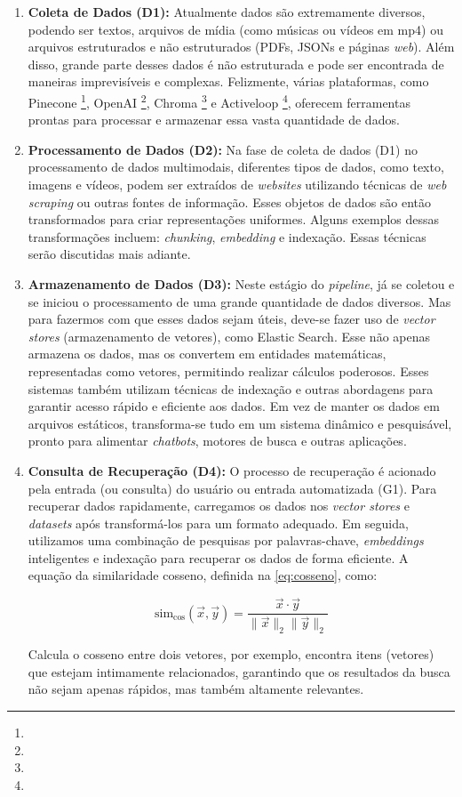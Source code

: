 \documentclass[a4paper, 12pt]{article}
\begin{document}
    \begin{enumerate}
        \item \textbf{Coleta de Dados (D1):} Atualmente dados são extremamente diversos, podendo ser textos, arquivos de mídia (como músicas ou vídeos em mp4) ou arquivos estruturados e não estruturados (PDFs, JSONs e páginas \textit{web}). Além disso, grande parte desses dados é não estruturada e pode ser encontrada de maneiras imprevisíveis e complexas. Felizmente, várias plataformas, como Pinecone \footnote{}, OpenAI \footnote{}, Chroma \footnote{} e Activeloop \footnote{}, oferecem ferramentas prontas para processar e armazenar essa vasta quantidade de dados.
        \item \textbf{Processamento de Dados (D2):} Na fase de coleta de dados (D1) no processamento de dados multimodais, diferentes tipos de dados, como texto, imagens e vídeos, podem ser extraídos de \textit{websites} utilizando técnicas de \textit{web scraping} ou outras fontes de informação. Esses objetos de dados são então transformados para criar representações uniformes. Alguns exemplos dessas transformações incluem: \textit{chunking}, \textit{embedding} e indexação. Essas técnicas serão discutidas mais adiante.
        \item \textbf{Armazenamento de Dados (D3):} Neste estágio do \textit{pipeline}, já se coletou e se iniciou o processamento de uma grande quantidade de dados diversos. Mas para fazermos com que esses dados sejam úteis, deve-se fazer uso de \textit{vector stores} (armazenamento de vetores), como Elastic Search. Esse não apenas armazena os dados, mas os convertem em entidades matemáticas, representadas como vetores, permitindo realizar cálculos poderosos. Esses sistemas também utilizam técnicas de indexação e outras abordagens para garantir acesso rápido e eficiente aos dados. Em vez de manter os dados em arquivos estáticos, transforma-se tudo em um sistema dinâmico e pesquisável, pronto para alimentar \textit{chatbots}, motores de busca e outras aplicações.
        \item \textbf{Consulta de Recuperação (D4):} O processo de recuperação é acionado pela entrada (ou consulta) do usuário ou entrada automatizada (G1). Para recuperar dados rapidamente, carregamos os dados nos \textit{vector stores} e \textit{datasets} após transformá-los para um formato adequado. Em seguida, utilizamos uma combinação de pesquisas por palavras-chave, \textit{embeddings} inteligentes e indexação para recuperar os dados de forma eficiente.
        A equação da similaridade cosseno, definida na \autoref{eq:cosseno}, como: 
        
        \begin{equation}
            \text{sim}_{\cos}(\vec{x}, \vec{y}) = \frac{\vec{x} \cdot \vec{y}}{\|\vec{x}\|_2 \|\vec{y}\|_2}
            \label{eq:cosseno}
        \end{equation}
        
        Calcula o cosseno entre dois vetores, por exemplo, encontra itens (vetores) que estejam intimamente relacionados, garantindo que os resultados da busca não sejam apenas rápidos, mas também altamente relevantes.
    \end{enumerate}
\end{document}
